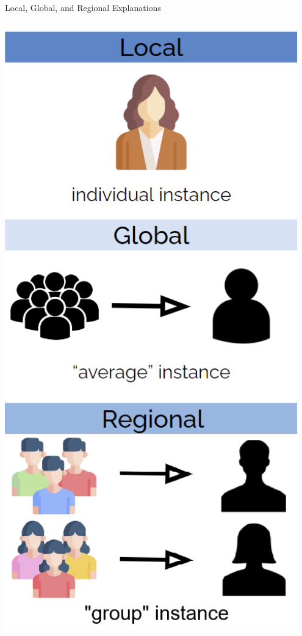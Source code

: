 \documentclass[11pt,compress,t,notes=noshow, aspectratio=169, xcolor=table]{beamer}
\begin{document}
\begin{frame}{Local, Global, and Regional Explanations}
\begin{columns}[T, totalwidth=\textwidth]
    \begin{column}{0.33\textwidth}
    \centering
    \includegraphics[width=0.95\textwidth]{figure/local_regional_global_col.png}
    
    \end{column}
\end{columns}
\end{frame}
\end{document}
